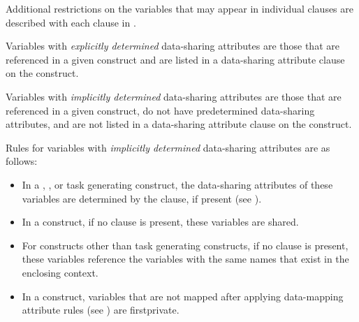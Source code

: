 Additional restrictions on the variables that may appear in individual clauses are
described with each clause in .

Variables with \emph{explicitly determined} data-sharing attributes are those that are referenced
in a given construct and are listed in a data-sharing attribute clause on the construct.

Variables with \emph{implicitly determined} data-sharing attributes are those that are referenced
in a given construct, do not have predetermined data-sharing attributes, and are not
listed in a data-sharing attribute clause on the construct.

Rules for variables with \emph{implicitly determined} data-sharing attributes are as follows:

\begin{itemize}
\item In a , , or task generating construct, the data-sharing attributes of these variables are
determined by the  clause, if present (see
).

\item In a  construct, if no  clause is present, these variables are
shared.

\item For constructs other than task generating constructs, if no  clause is present, these variables reference the variables with the same names that exist in the enclosing context.

\item In a  construct, variables that are not mapped after applying data-mapping attribute rules (see ) are firstprivate.
\end{itemize}


